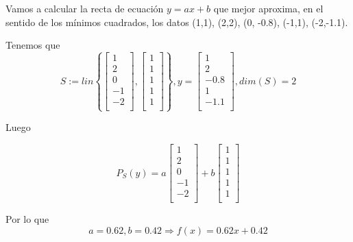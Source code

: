 \begin{ejemplo}
Vamos a calcular la recta de ecuación $y = ax+b$ que mejor aproxima, en el sentido de los mínimos cuadrados, los datos (1,1), (2,2), (0, -0.8), (-1,1), (-2,-1.1).

Tenemos que 
\[ S:= lin \left\lbrace \begin{bmatrix}
1 \\
2 \\
0 \\
-1 \\
-2 \\
\end{bmatrix}
, \begin{bmatrix}
1 \\
1 \\
1 \\
1 \\
1 \\
\end{bmatrix}
\right\rbrace
, y = \begin{bmatrix}
1 \\
2 \\
-0.8 \\
1 \\
-1.1 \\
\end{bmatrix}, dim (S) = 2 \]

Luego

\[ P_S(y) = a \begin{bmatrix}
1 \\
2 \\
0 \\
-1 \\
-2 \\
\end{bmatrix}
+ b \begin{bmatrix}
1 \\
1 \\
1 \\
1 \\
1 \\
\end{bmatrix} \]

Por lo que
\[ a = 0.62, b=0.42 \Rightarrow f(x) = 0.62x + 0.42 \]
\end{ejemplo}

